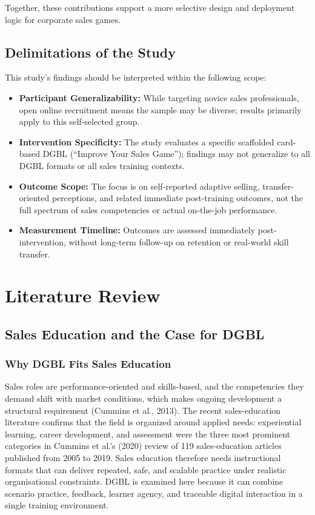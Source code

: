 \documentclass[12pt]{report}
\begin{document}
Together, these contributions support a more selective design and deployment logic for corporate sales games.

\section{Delimitations of the Study}
This study's findings should be interpreted within the following scope:

\begin{itemize}[leftmargin=1.2cm]
    \item \textbf{Participant Generalizability:} While targeting novice sales professionals, open online recruitment means the sample may be diverse; results primarily apply to this self-selected group.
    \item \textbf{Intervention Specificity:} The study evaluates a specific scaffolded card-based DGBL (``Improve Your Sales Game''); findings may not generalize to all DGBL formats or all sales training contexts.
    \item \textbf{Outcome Scope:} The focus is on self-reported adaptive selling, transfer-oriented perceptions, and related immediate post-training outcomes, not the full spectrum of sales competencies or actual on-the-job performance.
    \item \textbf{Measurement Timeline:} Outcomes are assessed immediately post-intervention, without long-term follow-up on retention or real-world skill transfer.
\end{itemize}

\chapter{Literature Review}

\section{Sales Education and the Case for DGBL}

\subsection{Why DGBL Fits Sales Education}
Sales roles are performance-oriented and skills-based, and the competencies they demand shift with market conditions, which makes ongoing development a structural requirement (Cummins et al., 2013). The recent sales-education literature confirms that the field is organized around applied needs: experiential learning, career development, and assessment were the three most prominent categories in Cummins et al.'s (2020) review of 119 sales-education articles published from 2005 to 2019. Sales education therefore needs instructional formats that can deliver repeated, safe, and scalable practice under realistic organisational constraints. DGBL is examined here because it can combine scenario practice, feedback, learner agency, and traceable digital interaction in a single training environment.
\end{document}
